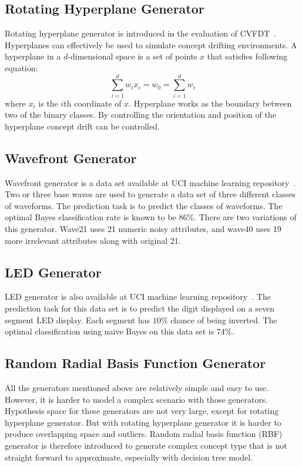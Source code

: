 \subsection*{Rotating Hyperplane Generator}
Rotating hyperplane generator is introduced in the evaluation of CVFDT~\cite{hulten01:cvfdt}. Hyperplanes can effectively be used to simulate concept drifting environments. A hyperplane in a $d$-dimensional space is a set of points $x$ that satisfies following equation:
\[
    \sum_{i=1}^{d} w_i x_i = w_0 = \sum_{i=1}^{d} w_i
\]
where $x_i$ is the $i$th coordinate of $x$. Hyperplane works as the boundary between two of the binary classes. By controlling the orientation and position of the hyperplane concept drift can be controlled. 

\subsection*{Wavefront Generator}
Wavefront generator is a data set available at UCI machine learning repository~\cite{internet:ucirepo}. Two or three base waves are used to generate a data set of three different classes of waveforms. The prediction task is to predict the classes of waveforms. The optimal Bayes classification rate is known to be $86\%$. There are two variations of this generator. Wave21 uses 21 numeric noisy attributes, and wave40 uses 19 more irrelevant attributes along with original 21.

\subsection*{LED Generator}
LED generator is also available at UCI machine learning repository~\cite{internet:ucirepo}. The prediction task for this data set is to predict the digit displayed on a seven segment LED display. Each segment has $10\%$ chance of being inverted. The optimal classification using naive Bayes on this data set is  $74\%$. 

\subsection*{Random Radial Basis Function Generator}
All the generators mentioned above are relatively simple and easy to use. However, it is harder to model a complex scenario with those generators. Hypothesis space for these generators are not very large, except for rotating hyperplane generator. But with rotating hyperplane generator it is harder to produce overlapping space and outliers. Random radial basis function (RBF) generator is therefore introduced to generate complex concept type that is not straight forward to approximate, especially with decision tree model.

